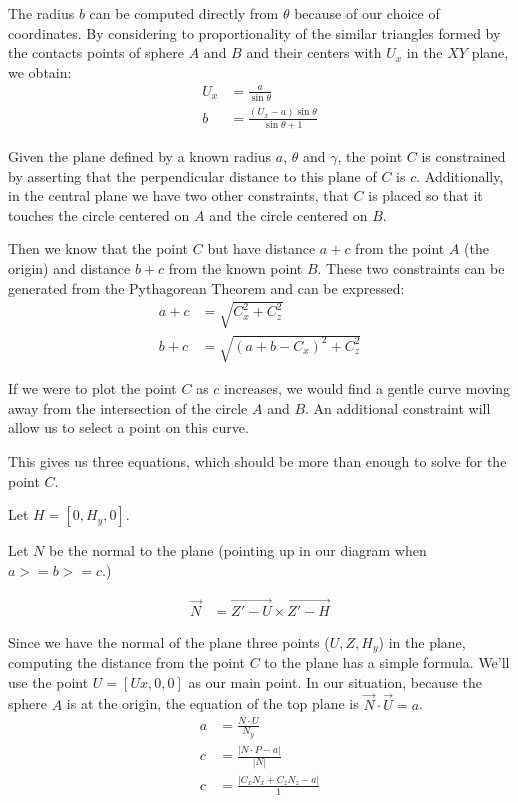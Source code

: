 \documentclass{article}
\begin{document}
The radius $b$ can be computed directly from $\theta$
because of our choice of coordinates.
By considering to proportionality of the similar triangles formed
by the contacts points of sphere $A$ and $B$ and their centers with $U_x$ in the $XY$ plane,
we obtain:
\begin{align}
  U_x &= \frac{a}{\sin{\theta}} \\
  b &= \frac{(U_x - a)\sin{\theta}}{\sin{\theta}+1}
\end{align}

\newcommand{\abs}[1]{ \left\lvert#1\right\rvert}

Given the plane defined by a known radius $a$, $\theta$ and $\gamma$,
the point $C$ is constrained by asserting that the perpendicular
distance to this plane of $C$ is $c$.
Additionally, in the central plane we have two other constraints,
that $C$ is placed so that it touches the circle centered on $A$ and
the circle centered on $B$.

Then we know that the point $C$ but have distance $a+c$ from
the point $A$ (the origin) and distance $b+c$ from the known
point $B$. These two constraints can be generated from the Pythagorean Theorem and can be expressed:
\begin{align}
a + c &= \sqrt{C_x^2 + C_z ^2} \label{eq:a_constraint}\\
b + c &= \sqrt{(a+b-C_x)^2 + C_z^2} \label{eq:b_constraint}
\end{align}

If we were to plot the point $C$ as $c$ increases, we
would find a gentle curve moving away from the intersection
of the circle $A$ and $B$. An additional constraint will
allow us to select a point on this curve.

This gives us three equations, which
should be more than enough to solve for the point $C$.

Let $H = [0, H_y,0]$.

Let $N$ be the normal to the plane (pointing up in our diagram
when $ a >= b >= c $.)

\begin{align}
\overrightarrow{N} &= \overrightarrow{Z' - U}  \times \overrightarrow{Z' - H}
\end{align}

Since we have the normal of the plane three points ($U,Z,H_y$) in the plane,
computing the distance from the point $C$ to the plane has a simple
formula.
We'll use the point $U = [Ux, 0, 0]$ as our main point.
In our situation, because the sphere $A$ is at the origin,
the equation of the top plane  is
$ \overrightarrow{N} \cdot \overrightarrow{U} = a$.
\begin{align}
a &= \frac{N \cdot U}{N_y} \\
c &= \frac{\abs{N \cdot P - a}}{\abs{N}} \\
c &= \frac{\abs{C_x  N_x  + C_z  N_z - a}}{1} \label{eq:c_constraint}
\end{align}
\end{document}
